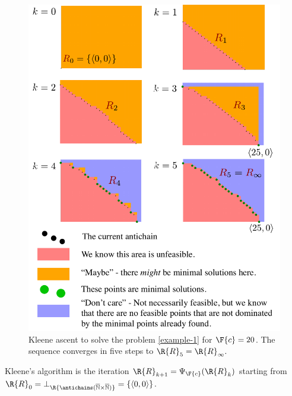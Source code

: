 \begin{figure}
\begin{centering}
\includegraphics[bb=0bp 0bp 458bp 621bp,clip,scale=0.5]{gmcdptro_example20}
\par\end{centering}
\caption{\label{fig:example24}Kleene ascent to solve the problem \eqref{example-1}
for $\F{c}=20$. The sequence converges in five steps to $\R{R}_{5}=\R{R}_{\infty}.$ }
\end{figure}

\noindent Kleene's algorithm is the iteration $\R{R}_{k+1}=\Psi_{\F{c}}(\R{R}_{k})$
starting from $\R{R}_{0}=\bot_{\R{\antichains(\overline{\mathbb{N}}\times\overline{\mathbb{N}})}}=\{\left\langle 0,0\right\rangle \}$.

